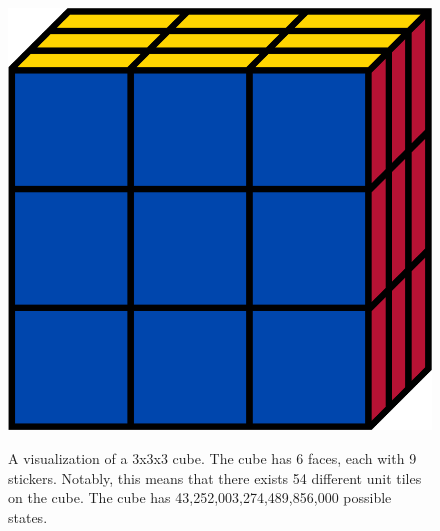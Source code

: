 \documentclass[12pt]{article}
\begin{document}
\begin{figure}[H]
    \hspace{20pt}
    \begin{minipage}{.3\textwidth}
        \includegraphics[scale=0.1]{cube.png}
    \end{minipage}%
    \begin{minipage}{.6\textwidth}
        A visualization of a 3x3x3 cube. The cube has 6 faces, each with 9 stickers. Notably, this means that there exists 54 different unit tiles on the cube. The cube has 43,252,003,274,489,856,000 possible states.
    \end{minipage}
    
    \vspace{20pt}
    

\end{figure}
\end{document}
